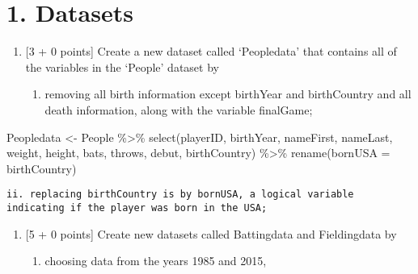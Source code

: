\documentclass[
]{article}
\newenvironment{Shaded}{\begin{snugshade}}{\end{snugshade}}
\newcommand{\AttributeTok}[1]{\textcolor[rgb]{0.77,0.63,0.00}{#1}}
\newcommand{\CommentTok}[1]{\textcolor[rgb]{0.56,0.35,0.01}{\textit{#1}}}
\newcommand{\FunctionTok}[1]{\textcolor[rgb]{0.00,0.00,0.00}{#1}}
\newcommand{\NormalTok}[1]{#1}
\newcommand{\OtherTok}[1]{\textcolor[rgb]{0.56,0.35,0.01}{#1}}
\newcommand{\SpecialCharTok}[1]{\textcolor[rgb]{0.00,0.00,0.00}{#1}}
\newcommand{\StringTok}[1]{\textcolor[rgb]{0.31,0.60,0.02}{#1}}
\providecommand{\tightlist}{%
  \setlength{\itemsep}{0pt}\setlength{\parskip}{0pt}}
\begin{document}
\hypertarget{datasets}{%
\section{1. Datasets}\label{datasets}}

\begin{enumerate}
\def\labelenumi{\alph{enumi}.}
\item
  {[}3 + 0 points{]} Create a new dataset called `Peopledata' that
  contains all of the variables in the `People' dataset by

  \begin{enumerate}
  \def\labelenumii{\roman{enumii}.}
  \tightlist
  \item
    removing all birth information except birthYear and birthCountry and
    all death information, along with the variable finalGame;
  \end{enumerate}
\end{enumerate}

\begin{Shaded}
\begin{Highlighting}[]
\NormalTok{Peopledata }\OtherTok{\textless{}{-}}\NormalTok{ People }\SpecialCharTok{\%\textgreater{}\%}
  \FunctionTok{select}\NormalTok{(playerID, birthYear, nameFirst, nameLast, weight, height, bats, throws, debut, birthCountry) }\SpecialCharTok{\%\textgreater{}\%}
  \FunctionTok{rename}\NormalTok{(}\AttributeTok{bornUSA =}\NormalTok{ birthCountry)}
\end{Highlighting}
\end{Shaded}

\begin{verbatim}
ii. replacing birthCountry is by bornUSA, a logical variable indicating if the player was born in the USA;
\end{verbatim}

\begin{Shaded}
\end{Shaded}

\begin{enumerate}
\def\labelenumi{\alph{enumi}.}
\setcounter{enumi}{1}
\item
  {[}5 + 0 points{]} Create new datasets called Battingdata and
  Fieldingdata by

  \begin{enumerate}
  \def\labelenumii{\roman{enumii}.}
  \tightlist
  \item
    choosing data from the years 1985 and 2015,
  \end{enumerate}
\end{enumerate}
\end{document}
